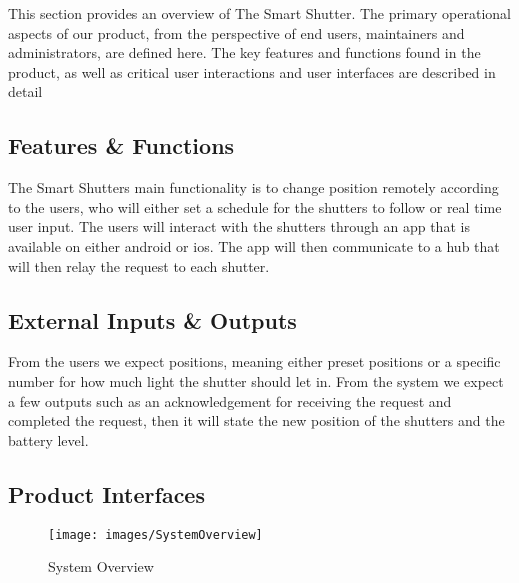 This section provides an overview of The Smart Shutter. The primary operational aspects of our product, from the perspective of end users, maintainers and administrators, are defined here. The key features and functions found in the product, as well as critical user interactions and user interfaces are described in detail

\subsection{Features \& Functions}
The Smart Shutters main functionality is to change position remotely according to the users, who will either set a schedule for the shutters to follow or real time user input. The users will interact with the shutters through an app that is available on either android or ios. The app will then communicate to a hub that will then relay the request to each shutter. 


\subsection{External Inputs \& Outputs}
From the users we expect positions, meaning either preset positions or a specific number for how much light the shutter should let in. From the system we expect a few outputs such as an acknowledgement for receiving the request and completed the request, then it will state the new position of the shutters and the battery level. 

\subsection{Product Interfaces}
\begin{figure}[H]
    \centering
    \texttt{[image: images/SystemOverview]}
    \caption{System Overview}
\end{figure}
